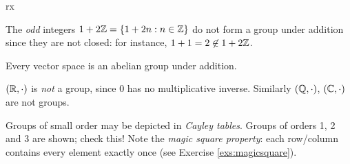 \begin{examples}{}{rx}
\begin{enumerate}
	  \item The \emph{odd} integers $1+2\mathbb{Z}=\{1+2n:n\in\mathbb{Z}\}$ do not form a group under addition since they are not closed: for instance, $1+1=2\not\in 1+2\mathbb{Z}$.
	  
	  \item Every vector space is an abelian group under addition. %
		
		\item $(\mathbb{R},\cdot)$ is \emph{not} a group, since $0$ has no multiplicative inverse. Similarly $(\mathbb{Q},\cdot)$, $(\mathbb{C},\cdot)$ are not groups.
		
	
		\begin{minipage}[t]{0.6\linewidth}\vspace{-9pt}
			\item\label{ex:smallcayley1} Groups of small order may be depicted in \emph{Cayley tables\footnotemark}.\smallbreak
			Groups of orders 1, 2 and 3 are shown; check this! Note the \emph{magic square property}: each row/column contains every element exactly once (see Exercise \ref{exs:magicsquare}).
		\end{minipage}
		\begin{minipage}[t]{0.39\linewidth}\vspace{-8pt}
			\flushright{}
			\end{minipage}	
		\end{enumerate}
	\end{examples}

	\vspace{-5pt}




